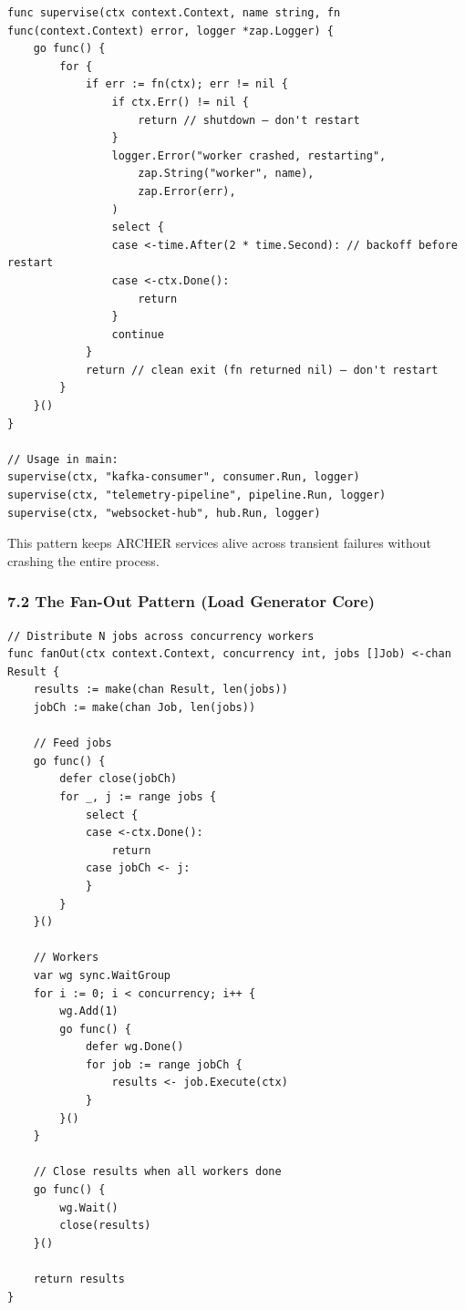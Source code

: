 \documentclass[11pt,a4paper,oneside]{book}
\begin{document}
\begin{verbatim}
func supervise(ctx context.Context, name string, fn func(context.Context) error, logger *zap.Logger) {
    go func() {
        for {
            if err := fn(ctx); err != nil {
                if ctx.Err() != nil {
                    return // shutdown — don't restart
                }
                logger.Error("worker crashed, restarting",
                    zap.String("worker", name),
                    zap.Error(err),
                )
                select {
                case <-time.After(2 * time.Second): // backoff before restart
                case <-ctx.Done():
                    return
                }
                continue
            }
            return // clean exit (fn returned nil) — don't restart
        }
    }()
}

// Usage in main:
supervise(ctx, "kafka-consumer", consumer.Run, logger)
supervise(ctx, "telemetry-pipeline", pipeline.Run, logger)
supervise(ctx, "websocket-hub", hub.Run, logger)
\end{verbatim}

This pattern keeps ARCHER services alive across transient failures
without crashing the entire process.

\subsubsection{7.2 The Fan-Out Pattern (Load Generator
Core)}

\begin{verbatim}
// Distribute N jobs across concurrency workers
func fanOut(ctx context.Context, concurrency int, jobs []Job) <-chan Result {
    results := make(chan Result, len(jobs))
    jobCh := make(chan Job, len(jobs))

    // Feed jobs
    go func() {
        defer close(jobCh)
        for _, j := range jobs {
            select {
            case <-ctx.Done():
                return
            case jobCh <- j:
            }
        }
    }()

    // Workers
    var wg sync.WaitGroup
    for i := 0; i < concurrency; i++ {
        wg.Add(1)
        go func() {
            defer wg.Done()
            for job := range jobCh {
                results <- job.Execute(ctx)
            }
        }()
    }

    // Close results when all workers done
    go func() {
        wg.Wait()
        close(results)
    }()

    return results
}
\end{verbatim}
\end{document}
